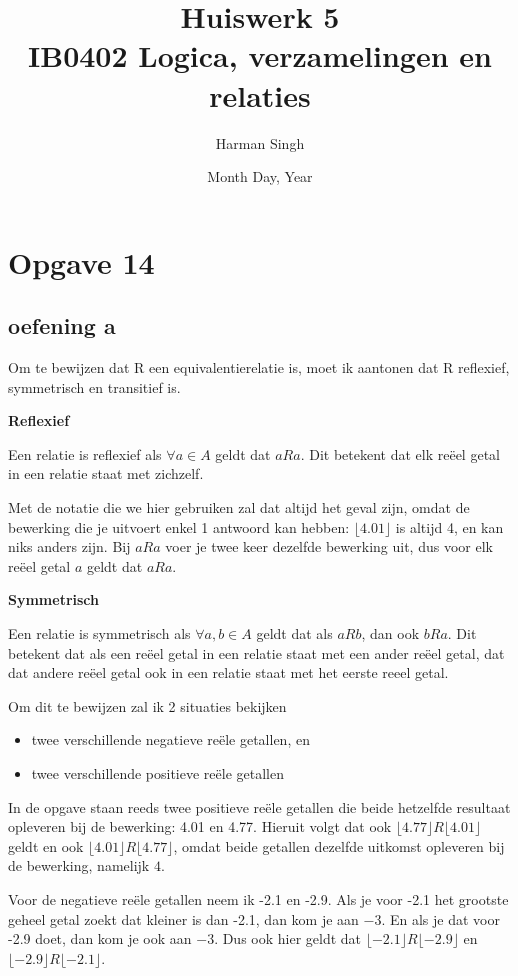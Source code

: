 \documentclass[11pt, a4paper]{article}
\title{Huiswerk 5 \\ IB0402 Logica, verzamelingen en relaties}
\author{Harman Singh}
\date{Month Day, Year}
\begin{document}
\maketitle

\pagebreak
\section*{Opgave 14}
\subsection*{oefening a}

Om te bewijzen dat R een equivalentierelatie is, moet ik aantonen dat R reflexief, symmetrisch en transitief is.

\textbf{Reflexief}

Een relatie is reflexief als $\forall a \in A$ geldt dat $aRa$. Dit betekent dat elk reëel getal in een relatie staat met zichzelf.

Met de notatie die we hier gebruiken zal dat altijd het geval zijn, omdat de bewerking die je uitvoert enkel 1 antwoord kan hebben: $\lfloor 4.01 \rfloor$ is altijd 4, en kan niks anders zijn. Bij $aRa$ voer je twee keer dezelfde bewerking uit, dus voor elk reëel getal $a$ geldt dat $aRa$.


\textbf{Symmetrisch}

Een relatie is symmetrisch als $\forall a, b \in A$ geldt dat als $aRb$, dan ook $bRa$. Dit betekent dat als een reëel getal in een relatie staat met een ander reëel getal, dat dat andere reëel getal ook in een relatie staat met het eerste reeel getal.

Om dit te bewijzen zal ik 2 situaties bekijken
\begin{itemize}
	\item twee verschillende negatieve reële getallen, en
	\item twee verschillende positieve reële getallen
\end{itemize}

In de opgave staan reeds twee positieve reële getallen die beide hetzelfde resultaat opleveren bij de bewerking: 4.01 en 4.77.
Hieruit volgt dat ook $\lfloor 4.77 \rfloor R \lfloor 4.01 \rfloor$ geldt en ook $\lfloor 4.01 \rfloor R \lfloor 4.77 \rfloor$, omdat beide getallen dezelfde uitkomst opleveren bij de bewerking, namelijk $4$. 

Voor de negatieve reële getallen neem ik -2.1 en -2.9. Als je voor -2.1 het grootste geheel getal zoekt dat kleiner is dan -2.1, dan kom je aan $-3$. En als je dat voor -2.9 doet, dan kom je ook aan $-3$. Dus ook hier geldt dat $\lfloor -2.1 \rfloor R \lfloor-2.9 \rfloor$ en $\lfloor -2.9 \rfloor R \lfloor -2.1 \rfloor$.
\end{document}
